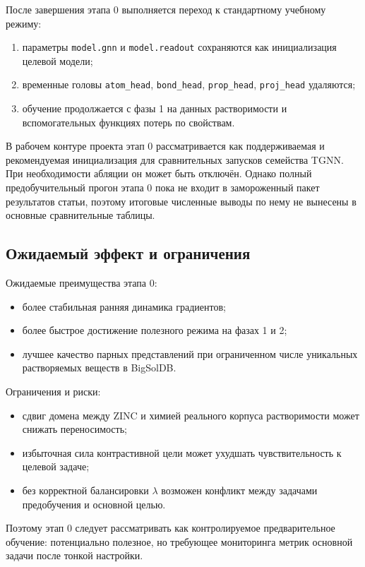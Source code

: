 \documentclass[11pt]{article}
\begin{document}
После завершения этапа 0 выполняется переход к стандартному учебному режиму:
\begin{enumerate}
  \item параметры \texttt{model.gnn} и \texttt{model.readout} сохраняются как инициализация целевой модели;
  \item временные головы \texttt{atom\_head}, \texttt{bond\_head}, \texttt{prop\_head}, \texttt{proj\_head} удаляются;
  \item обучение продолжается с фазы 1 на данных растворимости и вспомогательных функциях потерь по свойствам.
\end{enumerate}

В рабочем контуре проекта этап 0 рассматривается как поддерживаемая и рекомендуемая инициализация для сравнительных запусков семейства TGNN. При необходимости абляции он может быть отключён. Однако полный предобучительный прогон этапа 0 пока не входит в замороженный пакет результатов статьи, поэтому итоговые численные выводы по нему не вынесены в основные сравнительные таблицы.

\subsection{Ожидаемый эффект и ограничения}

Ожидаемые преимущества этапа 0:
\begin{itemize}
  \item более стабильная ранняя динамика градиентов;
  \item более быстрое достижение полезного режима на фазах 1 и 2;
  \item лучшее качество парных представлений при ограниченном числе уникальных растворяемых веществ в BigSolDB.
\end{itemize}

Ограничения и риски:
\begin{itemize}
  \item сдвиг домена между ZINC и химией реального корпуса растворимости может снижать переносимость;
  \item избыточная сила контрастивной цели может ухудшать чувствительность к целевой задаче;
  \item без корректной балансировки $\lambda$ возможен конфликт между задачами предобучения и основной целью.
\end{itemize}

Поэтому этап 0 следует рассматривать как контролируемое предварительное обучение: потенциально полезное, но требующее мониторинга метрик основной задачи после тонкой настройки.
\end{document}
